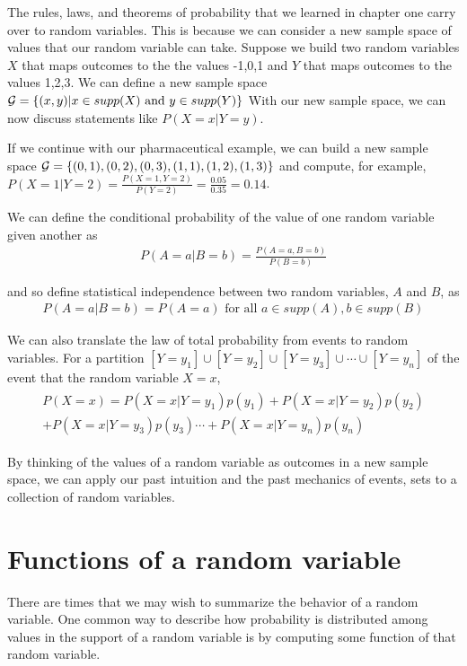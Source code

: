 The rules, laws, and theorems of probability that we learned in chapter one carry over to random variables.
This is because we can consider a new sample space of values that our random variable can take. 
Suppose we build two random variables $X$ that maps outcomes to the the values -1,0,1 and $Y$ that maps outcomes to the values 1,2,3. 
We can define a new sample space $\mathcal{G} = \{(x,y) | x \in supp(X) \text{ and } y \in supp(Y) \}$
With our new sample space, we can now discuss statements like $P(X = x | Y = y)$. 

\ex If we continue with our pharmaceutical example, we can build a new sample space $\mathcal{G} = \{(0,1),(0,2),(0,3),(1,1),(1,2),(1,3)\}$ and compute, for example, $P(X=1 | Y=2) = \frac{P(X=1,Y=2)}{P(Y=2)} = \frac{0.05}{0.35} = 0.14$.

We can define the conditional probability of the value of one random variable given another as 
\begin{align}
    P(A =a | B =b) = \frac{P(A=a,B=b)}{P(B=b)}
\end{align}

and so define statistical independence between two random variables, $A$ and $B$, as 
\begin{align}
    P(A = a | B=b) = P(A = a) \text{ for all } a \in supp(A),b \in supp(B)    
\end{align}

We can also translate the law of total probability from events to random variables.
For a partition $[Y=y_{1}] \cup [Y=y_{2}] \cup [Y=y_{3}] \cup \cdots \cup [Y=y_{n}]$ of the event that the random variable $X=x$,
\begin{align}
    \begin{aligned}
    P(X=x) = P(X=x|Y=y_{1})p(y_{1}) + P(X=x|Y=y_{2})p(y_{2})\\ + P(X=x|Y=y_{3})p(y_{3}) \cdots + P(X=x|Y=y_{n})p(y_{n})
    \end{aligned}
\end{align}

By thinking of the values of a random variable as outcomes in a new sample space, we can apply our past intuition and the past mechanics of events, sets to a collection of random variables.

\section{Functions of a random variable}

There are times that we may wish to summarize the behavior of a random variable.
One common way to describe how probability is distributed among values in the support of a random variable is by computing some function of that random variable. 


